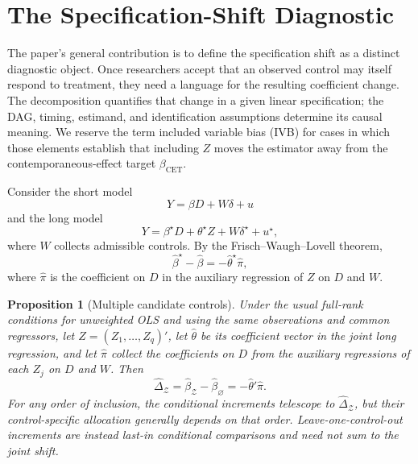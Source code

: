 \documentclass[
]{article}
\newtheorem{proposition}{Proposition}
\begin{document}
\section{\texorpdfstring{The Specification-Shift Diagnostic
\label{sec:ivb}}{The Specification-Shift Diagnostic }}\label{the-specification-shift-diagnostic}

The paper's general contribution is to define the specification shift as
a distinct diagnostic object. Once researchers accept that an observed
control may itself respond to treatment, they need a language for the
resulting coefficient change. The decomposition quantifies that change
in a given linear specification; the DAG, timing, estimand, and
identification assumptions determine its causal meaning. We reserve the
term included variable bias (IVB) for cases in which those elements
establish that including \(Z\) moves the estimator away from the
contemporaneous-effect target \(\beta_{\mathrm{CET}}\).

Consider the short model \begin{equation}
Y = \beta D + W \delta + u
\label{eq:short_pa}
\end{equation} and the long model \begin{equation}
Y = \beta^{\star} D + \theta^{\star} Z + W \delta^{\star} + u^{\star},
\label{eq:long_pa}
\end{equation} where \(W\) collects admissible controls. By the
Frisch--Waugh--Lovell theorem, \begin{equation}
\widehat{\beta}^{\star} - \widehat{\beta} = - \widehat{\theta}^{\star} \widehat{\pi},
\label{eq:ivb_main_pa}
\end{equation} where \(\widehat{\pi}\) is the coefficient on \(D\) in
the auxiliary regression of \(Z\) on \(D\) and \(W\).

\begin{proposition}[Multiple candidate controls]
Under the usual full-rank conditions for unweighted OLS and using the same observations and common regressors, let $Z=(Z_1,\ldots,Z_q)'$, let $\widehat\theta$ be its coefficient vector in the joint long regression, and let $\widehat\pi$ collect the coefficients on $D$ from the auxiliary regressions of each $Z_j$ on $D$ and $W$. Then
\[
\widehat\Delta_{\mathcal Z}
=
\widehat\beta_{\mathcal Z}-\widehat\beta_{\varnothing}
=
-\widehat\theta'\widehat\pi.
\]
For any order of inclusion, the conditional increments telescope to $\widehat\Delta_{\mathcal Z}$, but their control-specific allocation generally depends on that order. Leave-one-control-out increments are instead last-in conditional comparisons and need not sum to the joint shift.
\end{proposition}
\end{document}
